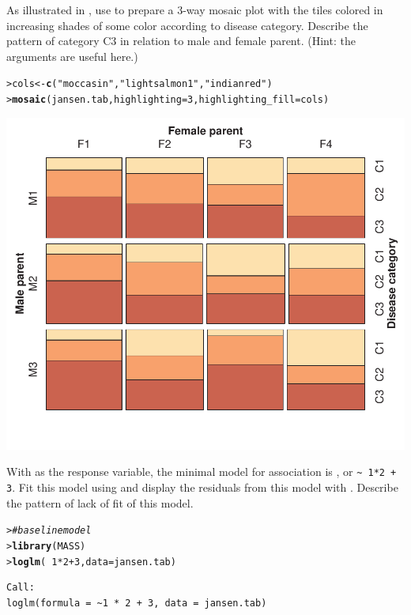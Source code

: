\documentclass[10pt]{report}\usepackage[]{graphicx}\usepackage[]{color}
\makeatletter
\newcommand{\hlnum}[1]{\textcolor[rgb]{0.686,0.059,0.569}{#1}}%
\newcommand{\hlstr}[1]{\textcolor[rgb]{0.192,0.494,0.8}{#1}}%
\newcommand{\hlcom}[1]{\textcolor[rgb]{0.678,0.584,0.686}{\textit{#1}}}%
\newcommand{\hlopt}[1]{\textcolor[rgb]{0,0,0}{#1}}%
\newcommand{\hlstd}[1]{\textcolor[rgb]{0.345,0.345,0.345}{#1}}%
\newcommand{\hlkwb}[1]{\textcolor[rgb]{0.69,0.353,0.396}{#1}}%
\newcommand{\hlkwc}[1]{\textcolor[rgb]{0.333,0.667,0.333}{#1}}%
\newcommand{\hlkwd}[1]{\textcolor[rgb]{0.737,0.353,0.396}{\textbf{#1}}}%
\newenvironment{kframe}{%
 \def\at@end@of@kframe{}%
 \ifinner\ifhmode%
  \def\at@end@of@kframe{\end{minipage}}%
  \begin{minipage}{\columnwidth}%
 \fi\fi%
 \def\FrameCommand##1{\hskip\@totalleftmargin \hskip-\fboxsep
 \colorbox{shadecolor}{##1}\hskip-\fboxsep
     \hskip-\linewidth \hskip-\@totalleftmargin \hskip\columnwidth}%
 \MakeFramed {\advance\hsize-\width
   \@totalleftmargin\z@ \linewidth\hsize
   \@setminipage}}%
 {\par\unskip\endMakeFramed%
 \at@end@of@kframe}
\newenvironment{knitrout}{}{} %
\renewenvironment{knitrout}{\small\renewcommand{\baselinestretch}{.85}}{} %
\makeatother
\begin{document}
\begin{Exercises}
\begin{enumerate*}
    \item As illustrated in , use  to prepare a 3-way mosaic
    plot with the tiles colored in increasing shades of some color according to
    disease category.  Describe the pattern of category C3 in relation to male and
    female parent.  (Hint: the  arguments are useful here.)
    \begin{ans}
\begin{knitrout}\footnotesize
{}\color{fgcolor}\begin{kframe}
\begin{alltt}
\hlstd{> }\hlstd{cols} \hlkwb{<-} \hlkwd{c}\hlstd{(}\hlstr{"moccasin"}\hlstd{,}\hlstr{"lightsalmon1"}\hlstd{,}\hlstr{"indianred"}\hlstd{)}
\hlstd{> }\hlkwd{mosaic}\hlstd{(jansen.tab,} \hlkwc{highlighting}\hlstd{=}\hlnum{3}\hlstd{,} \hlkwc{highlighting_fill}\hlstd{=cols)}
\end{alltt}
\end{kframe}

\centerline{\includegraphics[width=.5\textwidth]{soln/fig/ex5_6b-1} }



\end{knitrout}
    \end{ans}
    
    \item With  as the response variable, the minimal model for
    association is , or \verb|~ 1*2 + 3|.
    Fit this model using  and display the residuals from this model
    with . Describe the pattern of lack of fit of this model.
    \begin{ans}
\begin{knitrout}\footnotesize
{}\color{fgcolor}\begin{kframe}
\begin{alltt}
\hlstd{> }\hlcom{# baseline model}
\hlstd{> }\hlkwd{library}\hlstd{(MASS)}
\hlstd{> }\hlkwd{loglm}\hlstd{(}\hlopt{~}\hlnum{1}\hlopt{*}\hlnum{2}\hlopt{+}\hlnum{3}\hlstd{,}\hlkwc{data}\hlstd{=jansen.tab)}
\end{alltt}
\begin{verbatim}
Call:
loglm(formula = ~1 * 2 + 3, data = jansen.tab)


\end{verbatim}
\end{kframe}
\end{knitrout}
\end{ans}
\end{enumerate*}
\end{Exercises}
\end{document}
